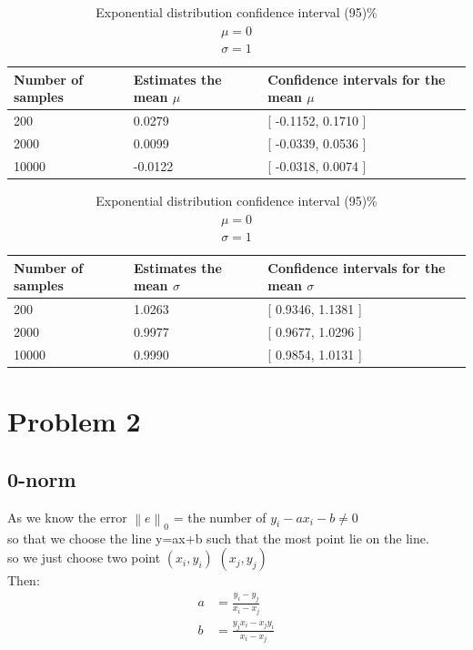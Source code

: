 \documentclass[12pt,a4paper]{article}
\begin{document}
\begin{table}[htbp]

\caption{Exponential distribution confidence interval (95)\% \\ 
		$\mu=0$ \\ $\sigma=1$} 
\centering

\begin{tabular}{lll}

	\toprule 
	Number of samples & 
	Estimates the mean $\mu$ & 
	Confidence intervals for the mean $\mu$ \\ 
	\midrule 
	200 & 0.0279 & [ -0.1152, 0.1710 ] \\ 
	2000 & 0.0099 & [ -0.0339, 0.0536 ] \\
	10000 & -0.0122 & [ -0.0318, 0.0074 ] \\ 
	\bottomrule 

\end{tabular} 

\begin{tabular}{lll}

	\toprule 
	Number of samples & 
	Estimates the mean $\sigma$ & 
	Confidence intervals for the mean $\sigma$ \\ 
	\midrule 
	200 & 1.0263 & [ 0.9346, 1.1381 ] \\ 
	2000 & 0.9977 & [ 0.9677, 1.0296 ] \\
	10000 & 0.9990 & [ 0.9854, 1.0131 ] \\ 
	\bottomrule 

\end{tabular} 

\end{table}


\newpage

\section{Problem 2}

\subsection{0-norm}
As we know the error 
$\left\|e\right\|_0$ = the number of ${y_i-ax_i-b\ne0}$\\
so that we choose the line y=ax+b such that the most point lie on the line.\\
so we just choose two point $(x_i,y_i)$ $(x_j,y_j)$\\

Then: \\
\begin{equation}
	\begin{aligned}
		a &= \frac{y_i-y_j}{x_i-x_j}\\
		b &= \frac{y_j x_i-x_j y_i}{x_i-x_j}\\
	\end{aligned}
\end{equation}
\end{document}
